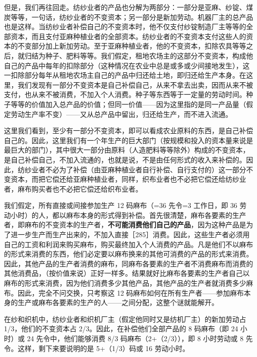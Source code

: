 但是，我们再往回走。纺纱业者的产品也分解为两部分：一部分是亚麻、纱锭、煤炭等等，一句话，纺纱业者的不变资本；另一部分是新加劳动。机器厂主的总产品也是这样。当纺纱业者补偿自己的不变资本时，他不仅支付纱锭制造厂主等等的全部资本，而且支付亚麻种植业者的全部资本。纺纱业者的不变资本支付这些人的资本的不变部分加上新加劳动。至于亚麻种植业者，他的不变资本，扣除农具等等之后，就归结为种子、肥料等等。我们假定，租地农场主的这部分不变资本，构成他自己的产品中每年的扣除部分（这种情况在农业中总是或多或少间接地发生），这一扣除部分每年从租地农场主自己的产品中归还给土地，即归还给生产本身。在这里，我们发现有一部分不变资本是自己补偿自己，从来不拿去出卖，因而从来不被支付，也从来不被消费，不加入个人消费。种子等东西等于一定量的劳动时间。种子等等的价值加入总产品的价值；但同一价值——因为这里指的是同一产品量（假定劳动生产率不变）——又从总产品中留出，归还给生产，而不进入流通。

这里我们看到，至少有一部分不变资本，即可以看成农业原料的东西，是自己补偿自己的。因此，这里我们有一个年生产的巨大部门（按规模和投入的资本量来说是最巨大的部门），其中很大一部分由原料（人造肥料等等除外）构成的不变资本，是自己补偿自己，不加入流通的，也就是说，不是由任何形式的收入来补偿的。因此，纺纱业者不必为了补偿（由亚麻种植业者自行补偿、自行支付的）这一部分不变资本，而把它偿还给亚麻种植业者，同样，织布业者也不必把它偿还给纺纱业者，麻布购买者也不必把它偿还给织布业者。

我们假定，所有直接或间接参加生产 12 码麻布（=36 先令=3 工作日，即 36 劳动小时）的人，都以麻布本身的形式得到补偿。首先很清楚，麻布各要素的生产者，即麻布的不变资本的生产者，\textbf{不可能消费他们自己的产品}，因为这种产品是为了进一步生产而生产出来的，不加入直接［285］消费。因此，这些生产者必须用自己的工资和利润来购买麻布，购买最终加入个人消费的产品。凡是他们不以麻布的形式来消费的东西，他们必定要以麻布换来的其他可消费的产品的形式来消费。因此，其他产品的生产者消费的麻布，同麻布各要素的生产者不消费麻布而消费的其他消费品，（按价值来说）正好一样多。结果就好比麻布各要素的生产者自己以麻布的形式来消费，因为他们消费多少其他产品，其他产品的生产者就消费多少麻布。因此，完全不问交换，只考察这 12 码麻布如何在所有生产者——参加麻布本身的生产或麻布各要素的生产的人——之间分配，这整个谜就能解开。

在纱和织机中，纺纱业者和织机厂主（假定他同时又是纺机厂主）的新加劳动占 1/3，他们的不变资本占 2/3。因此，在补偿他们全部产品的 8 码麻布（即 24 小时）或 24 先令中，他们能够消费 8/3 码麻布（2+（2/3）），即 8 小时劳动或 8 先令。这样，剩下来要说明的是 5+（1/3）码或 16 劳动小时。

